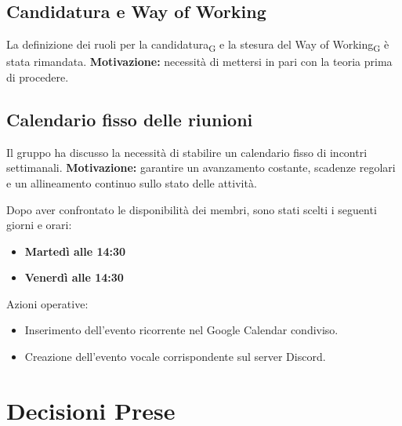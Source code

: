 \subsection{Candidatura e Way of Working}
La definizione dei ruoli per la candidatura\textsubscript{G} e la stesura del Way of Working\textsubscript{G} è stata rimandata.  
\textbf{Motivazione:} necessità di mettersi in pari con la teoria prima di procedere.

\subsection{Calendario fisso delle riunioni}
Il gruppo ha discusso la necessità di stabilire un calendario fisso di incontri settimanali.  
\textbf{Motivazione:} garantire un avanzamento costante, scadenze regolari e un allineamento continuo sullo stato delle attività.

Dopo aver confrontato le disponibilità dei membri, sono stati scelti i seguenti giorni e orari:
\begin{itemize}
    \item \textbf{Martedì alle 14:30}
    \item \textbf{Venerdì alle 14:30}
\end{itemize}

Azioni operative:
\begin{itemize}
    \item Inserimento dell’evento ricorrente nel Google Calendar condiviso.
    \item Creazione dell’evento vocale corrispondente sul server Discord.
\end{itemize}

\section{Decisioni Prese}

\renewcommand{\arraystretch}{1.3}

